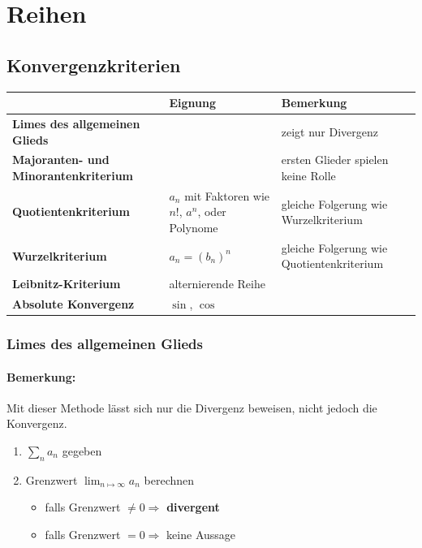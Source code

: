 \documentclass[11pt]{article}
\begin{document}
\section{Reihen}

\subsection{Konvergenzkriterien}

\begin{table}[H]
\centering
\begin{tabular}{|p{5cm}|p{4cm}|p{5cm}|}
\hline
                                             & \textbf{Eignung}    & \textbf{Bemerkung}                        \\ \hline
\textbf{Limes des allgemeinen Glieds}        &                     & zeigt nur Divergenz                       \\ \hline
\textbf{Majoranten- und Minorantenkriterium} &                     & ersten Glieder spielen keine Rolle        \\ \hline
\textbf{Quotientenkriterium}                 & $a_n$ mit Faktoren wie $n!$, $a^n$, oder Polynome & gleiche Folgerung wie Wurzelkriterium     \\ \hline
\textbf{Wurzelkriterium}                     & $a_n = (b_n)^n$     & gleiche Folgerung wie Quotientenkriterium \\ \hline
\textbf{Leibnitz-Kriterium}                  & alternierende Reihe &                                           \\ \hline
\textbf{Absolute Konvergenz}                 & $\sin$, $\cos$	   &                                           \\ \hline
\end{tabular}
\end{table}
\subsubsection*{Limes des allgemeinen Glieds}

\paragraph{Bemerkung:} Mit dieser Methode lässt sich nur die Divergenz beweisen, nicht jedoch die Konvergenz.

\begin{enumerate}
	\item $\sum_n a_n$ gegeben
	\item Grenzwert $\lim_{n\mapsto\infty} a_n$ berechnen
	\begin{itemize}
		\item falls Grenzwert $\neq 0 \Rightarrow$ \textbf{divergent} 
		\item falls Grenzwert $= 0 \Rightarrow$ keine Aussage 
	\end{itemize}
\end{enumerate}
\end{document}
